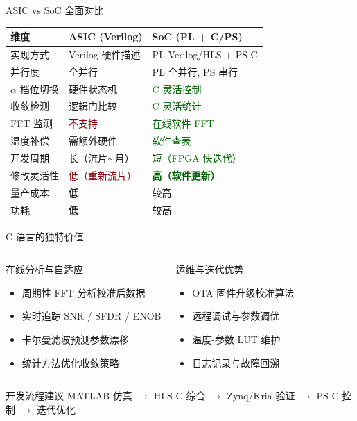 \documentclass[table,UTF8,11pt,aspectratio=169]{beamer}
\begin{document}
\begin{frame}{ASIC vs SoC 全面对比}
\begin{table}
\begin{tabular}{p{2.5cm}p{3.2cm}p{3.5cm}}
\toprule
\textbf{维度} & \textbf{ASIC (Verilog)} & \textbf{SoC (PL + C/PS)} \\
\midrule
实现方式 & Verilog 硬件描述 & PL Verilog/HLS + PS C \\
并行度 & 全并行 & PL 全并行, PS 串行 \\
$\alpha$ 档位切换 & 硬件状态机 & \textcolor{darkgreen}{C 灵活控制} \\
收敛检测 & 逻辑门比较 & \textcolor{darkgreen}{C 灵活统计} \\
FFT 监测 & \textcolor{darkred}{不支持} & \textcolor{darkgreen}{在线软件 FFT} \\
温度补偿 & 需额外硬件 & \textcolor{darkgreen}{软件查表} \\
开发周期 & 长（流片$\sim$月） & \textcolor{darkgreen}{短（FPGA 快迭代）} \\
修改灵活性 & \textcolor{darkred}{低（重新流片）} & \textcolor{darkgreen}{\textbf{高（软件更新）}} \\
量产成本 & \textbf{低} & 较高 \\
功耗 & \textbf{低} & 较高 \\
\bottomrule
\end{tabular}
\end{table}
\end{frame}

\begin{frame}{C 语言的独特价值}
\begin{columns}[T]
\begin{block}{在线分析与自适应}
\begin{itemize}
    \item 周期性 FFT 分析校准后数据
    \item 实时追踪 SNR / SFDR / ENOB
    \item 卡尔曼滤波预测参数漂移
    \item 统计方法优化收敛策略
\end{itemize}
\end{block}

\begin{block}{运维与迭代优势}
\begin{itemize}
    \item OTA 固件升级校准算法
    \item 远程调试与参数调优
    \item 温度-参数 LUT 维护
    \item 日志记录与故障回溯
\end{itemize}
\end{block}
\end{columns}

\vspace{0.4cm}
\begin{alertblock}{开发流程建议}
MATLAB 仿真 $\to$ HLS C 综合 $\to$ Zynq/Kria 验证 $\to$ PS C 控制 $\to$ 迭代优化
\end{alertblock}
\end{frame}
\end{document}
